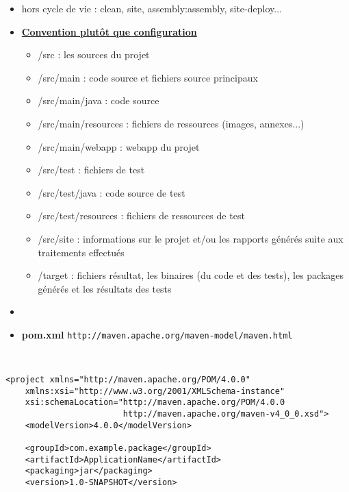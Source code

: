 \documentclass[11pt,twoside,a4paper]{article}
\begin{document}
\begin{landscape}
\begin{multicols}{2}
\begin{itemize}
		\item hors cycle de vie : \textsf{clean}, \textsf{site}, \textsf{assembly:assembly}, \textsf{site-deploy}...
		\item \underline{\textbf{Convention plutôt que configuration}}
		\begin{itemize}
			\item \textsf{/src} : les sources du projet
			\item \textsf{/src/main} : code source et fichiers source principaux
			\item \textsf{/src/main/java} : code source
			\item \textsf{/src/main/resources} : fichiers de ressources (images, annexes...)
			\item \textsf{/src/main/webapp} : webapp du projet
			\item \textsf{/src/test} : fichiers de test
			\item \textsf{/src/test/java} : code source de test
			\item \textsf{/src/test/resources} : fichiers de ressources de test
			\item \textsf{/src/site} : informations sur le projet et/ou les rapports générés suite aux traitements effectués
			\item \textsf{/target} : fichiers résultat, les binaires (du code et des tests), les packages générés et les résultats des tests
		\end{itemize}
		\item[]
		\item \textbf{pom.xml} \texttt{http://maven.apache.org/maven-model/maven.html}
	\end{itemize}
	
	~\\
	
	\columnbreak
	
	\footnotesize
	\begin{verbatim}
<project xmlns="http://maven.apache.org/POM/4.0.0"
    xmlns:xsi="http://www.w3.org/2001/XMLSchema-instance"
    xsi:schemaLocation="http://maven.apache.org/POM/4.0.0
                        http://maven.apache.org/maven-v4_0_0.xsd">
    <modelVersion>4.0.0</modelVersion>
    
    <groupId>com.example.package</groupId>
    <artifactId>ApplicationName</artifactId>
    <packaging>jar</packaging>
    <version>1.0-SNAPSHOT</version>
    

\end{verbatim}
\end{multicols}
\end{landscape}
\end{document}
